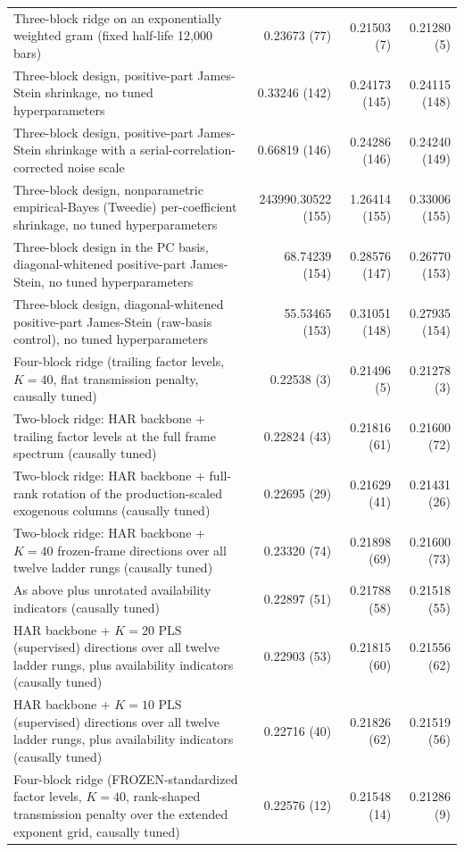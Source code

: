 \begin{longtable}{p{}rrr}
Three-block ridge on an exponentially weighted gram (fixed half-life 12{,}000 bars) & 0.23673 (77) & 0.21503 (7) & 0.21280 (5) \\
Three-block design, positive-part James-Stein shrinkage, no tuned hyperparameters & 0.33246 (142) & 0.24173 (145) & 0.24115 (148) \\
Three-block design, positive-part James-Stein shrinkage with a serial-correlation-corrected noise scale & 0.66819 (146) & 0.24286 (146) & 0.24240 (149) \\
Three-block design, nonparametric empirical-Bayes (Tweedie) per-coefficient shrinkage, no tuned hyperparameters & 243990.30522 (155) & 1.26414 (155) & 0.33006 (155) \\
Three-block design in the PC basis, diagonal-whitened positive-part James-Stein, no tuned hyperparameters & 68.74239 (154) & 0.28576 (147) & 0.26770 (153) \\
Three-block design, diagonal-whitened positive-part James-Stein (raw-basis control), no tuned hyperparameters & 55.53465 (153) & 0.31051 (148) & 0.27935 (154) \\
Four-block ridge (trailing factor levels, $K=40$, flat transmission penalty, causally tuned) & 0.22538 (3) & 0.21496 (5) & 0.21278 (3) \\
Two-block ridge: HAR backbone + trailing factor levels at the full frame spectrum (causally tuned) & 0.22824 (43) & 0.21816 (61) & 0.21600 (72) \\
Two-block ridge: HAR backbone + full-rank rotation of the production-scaled exogenous columns (causally tuned) & 0.22695 (29) & 0.21629 (41) & 0.21431 (26) \\
Two-block ridge: HAR backbone + $K=40$ frozen-frame directions over all twelve ladder rungs (causally tuned) & 0.23320 (74) & 0.21898 (69) & 0.21600 (73) \\
As above plus unrotated availability indicators (causally tuned) & 0.22897 (51) & 0.21788 (58) & 0.21518 (55) \\
HAR backbone + $K=20$ PLS (supervised) directions over all twelve ladder rungs, plus availability indicators (causally tuned) & 0.22903 (53) & 0.21815 (60) & 0.21556 (62) \\
HAR backbone + $K=10$ PLS (supervised) directions over all twelve ladder rungs, plus availability indicators (causally tuned) & 0.22716 (40) & 0.21826 (62) & 0.21519 (56) \\
Four-block ridge (FROZEN-standardized factor levels, $K=40$, rank-shaped transmission penalty over the extended exponent grid, causally tuned) & 0.22576 (12) & 0.21548 (14) & 0.21286 (9) \\

\end{longtable}
